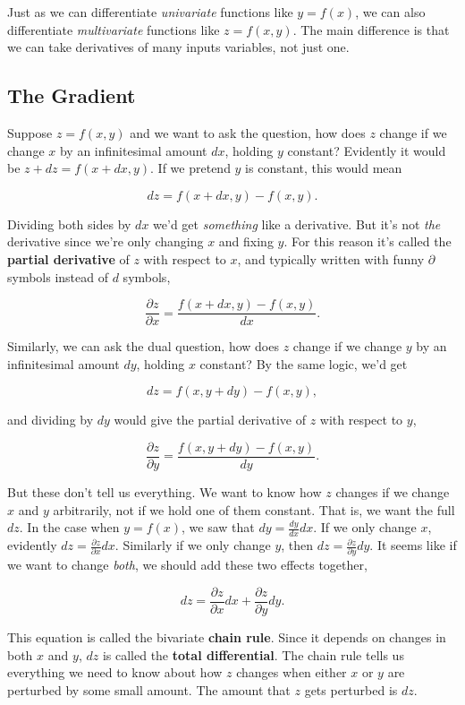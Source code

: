 \documentclass[
  letterpaper,
  DIV=11,
  numbers=noendperiod]{scrreprt}
\begin{document}
Just as we can differentiate \emph{univariate} functions like
\(y=f(x)\), we can also differentiate \emph{multivariate} functions like
\(z=f(x,y)\). The main difference is that we can take derivatives of
many inputs variables, not just one.

\hypertarget{the-gradient}{%
\subsection{The Gradient}\label{the-gradient}}

Suppose \(z=f(x,y)\) and we want to ask the question, how does \(z\)
change if we change \(x\) by an infinitesimal amount \(dx\), holding
\(y\) constant? Evidently it would be \(z + dz = f(x+dx, y)\). If we
pretend \(y\) is constant, this would mean

\[dz = f(x+dx, y) - f(x, y).\]

Dividing both sides by \(dx\) we'd get \emph{something} like a
derivative. But it's not \emph{the} derivative since we're only changing
\(x\) and fixing \(y\). For this reason it's called the \textbf{partial
derivative} of \(z\) with respect to \(x\), and typically written with
funny \(\partial\) symbols instead of \(d\) symbols,

\[\frac{\partial z}{\partial x} = \frac{f(x+dx, y) - f(x, y)}{dx}.\]

Similarly, we can ask the dual question, how does \(z\) change if we
change \(y\) by an infinitesimal amount \(dy\), holding \(x\) constant?
By the same logic, we'd get

\[dz = f(x, y + dy) - f(x, y),\]

and dividing by \(dy\) would give the partial derivative of \(z\) with
respect to \(y\),

\[\frac{\partial z}{\partial y} = \frac{f(x, y + dy) - f(x, y)}{dy}.\]

But these don't tell us everything. We want to know how \(z\) changes if
we change \(x\) and \(y\) arbitrarily, not if we hold one of them
constant. That is, we want the full \(dz\). In the case when \(y=f(x)\),
we saw that \(dy=\frac{dy}{dx}dx\). If we only change \(x\), evidently
\(dz = \frac{\partial z}{\partial x} dx\). Similarly if we only change
\(y\), then \(dz = \frac{\partial z}{\partial y} dy\). It seems like if
we want to change \emph{both}, we should add these two effects together,

\[dz = \frac{\partial z}{\partial x} dx + \frac{\partial z}{\partial y} dy.\]

This equation is called the bivariate \textbf{chain rule}. Since it
depends on changes in both \(x\) and \(y\), \(dz\) is called the
\textbf{total differential}. The chain rule tells us everything we need
to know about how \(z\) changes when either \(x\) or \(y\) are perturbed
by some small amount. The amount that \(z\) gets perturbed is \(dz\).
\end{document}
